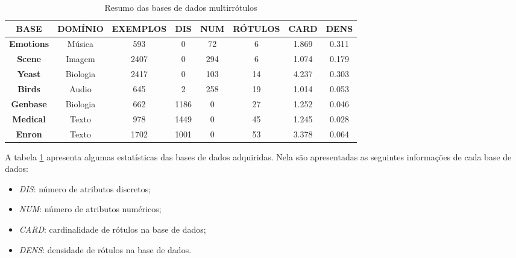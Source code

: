 \begin{table}[h]
\begin{tabular}{|c|ccccccc|}
\hline
\textbf{BASE}     & \textbf{DOMÍNIO} & \textbf{EXEMPLOS} & \textbf{DIS} & \textbf{NUM} & \textbf{RÓTULOS} & \textbf{CARD} & \textbf{DENS} \\ \hline
\textbf{Emotions} & Música           & 593               & 0                 & 72                 & 6                & 1.869                  & 0.311              \\
\textbf{Scene}    & Imagem           & 2407              & 0                 & 294                & 6                & 1.074                  & 0.179              \\
\textbf{Yeast}    & Biologia         & 2417              & 0                 & 103                & 14               & 4.237                  & 0.303              \\
\textbf{Birds}    & Audio            & 645               & 2                 & 258                & 19               & 1.014                  & 0.053              \\
\textbf{Genbase}  & Biologia         & 662               & 1186              & 0                  & 27               & 1.252                  & 0.046              \\
\textbf{Medical}  & Texto            & 978               & 1449              & 0                  & 45               & 1.245                  & 0.028              \\
\textbf{Enron}    & Texto            & 1702              & 1001              & 0                  & 53               & 3.378                  & 0.064             \\ \hline
\end{tabular}
\caption{Resumo das bases de dados multirrótulos}
\label{tab:datas}
\end{table}

A tabela \ref{tab:datas} apresenta algumas estatísticas das bases de dados adquiridas.
Nela são apresentadas as seguintes informações de cada base de dados:
\begin{itemize}
  \item \textit{DIS}: número de atributos discretos;
  \item \textit{NUM}: número de atributos numéricos;
  \item \textit{CARD}: cardinalidade de rótulos na base de dados;
  \item \textit{DENS}: densidade de rótulos na base de dados.
\end{itemize}


